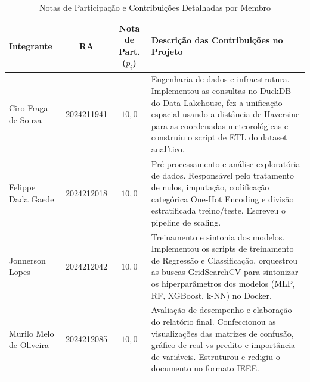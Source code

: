 \documentclass[conference]{IEEEtran}
\begin{document}
\begin{table}[H]
\centering
\caption{Notas de Participação e Contribuições Detalhadas por Membro}
\label{tab:contribuicoes}
\begin{tabular}{lccp{8cm}}
\toprule
\textbf{Integrante} & \textbf{RA} & \textbf{Nota de Part. ($p_i$)} & \textbf{Descrição das Contribuições no Projeto} \\
\midrule
Ciro Fraga de Souza & 2024211941 & $10{,}0$ & Engenharia de dados e infraestrutura. Implementou as consultas no DuckDB do Data Lakehouse, fez a unificação espacial usando a distância de Haversine para as coordenadas meteorológicas e construiu o script de ETL do dataset analítico. \\
\addlinespace
Felippe Dada Gaede & 2024212018 & $10{,}0$ & Pré-processamento e análise exploratória de dados. Responsável pelo tratamento de nulos, imputação, codificação categórica One-Hot Encoding e divisão estratificada treino/teste. Escreveu o pipeline de scaling. \\
\addlinespace
Jonnerson Lopes & 2024212042 & $10{,}0$ & Treinamento e sintonia dos modelos. Implementou os scripts de treinamento de Regressão e Classificação, orquestrou as buscas GridSearchCV para sintonizar os hiperparâmetros dos modelos (MLP, RF, XGBoost, k-NN) no Docker. \\
\addlinespace
Murilo Melo de Oliveira & 2024212085 & $10{,}0$ & Avaliação de desempenho e elaboração do relatório final. Confeccionou as visualizações das matrizes de confusão, gráfico de real vs predito e importância de variáveis. Estruturou e redigiu o documento no formato IEEE. \\
\bottomrule
\end{tabular}
\end{table}
\end{document}
